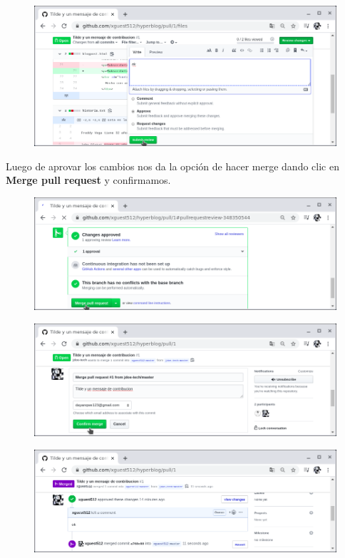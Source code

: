 \documentclass{article}
\begin{document}
\begin{figure}[h!]
  \centering
  \includegraphics[scale=0.75]{./Pictures/323_review_ok.png}
\end{figure}

Luego de aprovar los cambios nos da la opción de hacer merge dando clic en
\textbf{Merge pull request} y confirmamos.

\begin{figure}[h!]
  \centering
  \includegraphics[scale=0.75]{./Pictures/324_merge_pr.png}
\end{figure}

\begin{figure}[h!]
  \centering
  \includegraphics[scale=0.75]{./Pictures/325_confirm_merge.png}
\end{figure}

\begin{figure}[h!]
  \centering
  \includegraphics[scale=0.75]{./Pictures/326_merged.png}
\end{figure}
\end{document}
